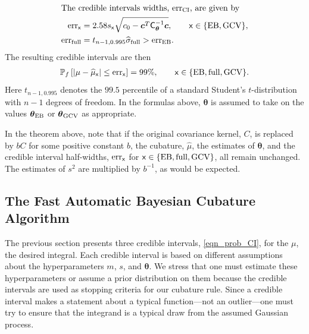 \documentclass{svjour3}                     %
\newcommand{\bm}[1]{\boldsymbol{#1}}
\newcommand{\vtheta}{{\bm{\theta}}}
\newcommand{\vc}{\bm{c}}
\newcommand{\mCthetaInv}{{\mathsf{C}^{-1}_{\vtheta}}}
\newcommand{\hmu}{\widehat{\mu}}
\newcommand{\hsigma}{\widehat{\sigma}}
\newcommand{\MLE}{\textup{EB}}
\newcommand{\full}{\textup{full}}
\newcommand{\GCV}{\textup{GCV}}
\newcommand{\CI}{\textup{CI}}
\newcommand{\err}{\textup{err}}
\begin{document}
\begin{theorem}
\begin{align}
	\intertext{The credible intervals widths, $\err_{\CI}$, are given by}
	\label{eqn:err_MLEGCV}
	\err_{\mathsf{x}} & = 2.58 s_{\mathsf{x}} \sqrt{c_{0} - \vc^T\mCthetaInv\vc }, \qquad \mathsf{x} \in \{\MLE, \GCV\},  \\ 
	\err_{\textup{full}} 
	& = t_{n-1,0.995} \hsigma_{\textup{full}} > \err_\MLE. \label{FJH:eq:errFull}
	\end{align}
	The resulting credible intervals are then
	\begin{align}
	\label{eqn_prob_CI}
	\mathbb{P}_f \left[
	|\mu-\hmu_{\mathsf{x}}| \leq \err_{\mathsf{x}} \right]  = 99\%, \qquad \mathsf{x} \in \{\MLE, \full, \GCV\}.
	\end{align}
	Here $t_{n-1,0.995}$ denotes the $99.5$ percentile of a standard Student's $t$-distribution with $n-1$ degrees of freedom.  In the formulas above, $\vtheta$ is assumed to take on the values $\vtheta_{\MLE}$ or $\vtheta_{\GCV}$ as appropriate.
\end{theorem}
\fi

In the theorem above, note that if the original covariance kernel, $C$, is replaced by $b C$ for some positive constant $b$, the cubature, $\hmu$, the estimates of $\vtheta$, and the credible interval half-widths, $\err_{\mathsf{x}}$ for $\mathsf{x} \in \{\MLE, \full, \GCV\}$, all remain unchanged.  The estimates of $s^2$ are multiplied by $b^{-1}$, as would be expected. 






\subsection{The Fast Automatic Bayesian Cubature Algorithm} 


The previous section presents three credible intervals, \eqref{eqn_prob_CI}, %
for the $\mu$, the desired integral.  Each credible interval is based on different assumptions about the hyperparameters $m$, $s$, and $\vtheta$.  We stress that one must estimate these hyperparameters or assume a prior distribution on them because the credible intervals are used as stopping criteria for our cubature rule.  Since a credible interval makes a statement about a typical function---not an outlier---one must try to ensure that the integrand is a typical draw from the assumed Gaussian process.
\end{document}
